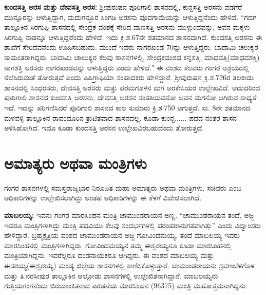 \textbf{ಕುಂದಸತ್ತಿ ಅರಸ ಮತ್ತು ದೇವಸತ್ತಿ ಅರಸ:} ಶ‍್ರೀಪುರುಷನ ಪೂರಿಗಾಲಿ ಶಾಸನದಲ್ಲಿ, ಕುನ್ದಸತ್ತಿ ಅರಸನು ವಡಗೆರೆ ಮುನ್ನೂರನ್ನು ಆಳುತ್ತಿದ್ದಾಗ, ಮದುಗನ್ದೂರ ಸಿಂಗಡಿ ಅರಸನು ಪೂವಗಾಮೆಯನ್ನು ಆಳುತ್ತಿದ್ದನೆಂದು ಹೇಳಿದೆ. “ಗದಗ ತಾಲ್ಲೂಕಿನ ಸಿರಗುಪ್ಪಿ ಶಾಸನದಲ್ಲಿ ಸೇಂದ್ರಕ ವಂಶಕ್ಕೆ ಸೇರಿದ ವಾಣಸತ್ತಿ ಅರಸನು ಮುಳ್ಗುಂದವನ್ನು, ಅವನ ಮಕ್ಕಳು ಸಿರಗುಪ್ಪಿ ನಾಡನ್ನೂ ಆಳುತ್ತಿದ್ದರೆಂದು ಹೇಳಿದೆ. ಇದು ಕ್ರಿ.ಶ.6\enginline{-}7ನೇ ಶತಮಾನದ ಶಾಸನವಾಗಿದೆ. ಕುಂದಸತ್ತಿ ಅರಸನು ಈ ಶಾಖೆಗೆ ಸೇರಿದವನೆಂದು ಊಹಿಸಬಹುದು. ಮುಂದೆ ಇವರು ನಾಗರಖಂಡ 70ನ್ನು ಆಳುತ್ತಿದ್ದರು. ಬಾದಾಮಿ ಚಲುಕ್ಯರ ಸಾಮಂತರಾಗಿದ್ದರು. ಬಾದಾಮಿ ಚಾಲುಕ್ಯರ ಕೆಲವು ಶಾಸನಗಳಲ್ಲಿ, ಸೇಂದ್ರಕವಂಶದ ಕನ್ನಸತ್ತಿ, ಮಾಧವತ್ತಿ(ಮಾಧವಶಕ್ತಿ) ನಾಗಶಕ್ತಿ ಅರಸರು ನಾಗರಖಂಡವನ್ನು ಆಳುತ್ತಿದ್ದರು ಎಂದು ಹೇಳಿದೆ." ಈ ವಂಶದ ಕೆಲವರು ಗಂಗರ ಆಶ್ರಯದಲ್ಲಿ ನೆಲೆಸಿರುವಂತೆ ತೋರುತ್ತದೆ ಎಂದು ಎಪಿಗ್ರಾಫಿಯಾ ಸಂಪಾದಕರು ಹೇಳಿದ್ದಾರೆ. ಶ‍್ರೀಪುರುಷನ ಕ್ರಿ.ಶ.726ರ ತಲಕಾಡು ಶಾಸನದಲ್ಲಿ ಸಿಂಧರಸರು, ದೇವಸತ್ತಿ ಅರಸರು ಮತ್ತು ಪರಮಗೂಳನ ಮಗ ಅರಕೇಸಿಯರ ಉಲ್ಲೇಖವಿದೆ. ಆದುದರಿಂದ ಪೂರಿಗಾಲಿ ಶಾಸನದ ಕುಂದಸತ್ತಿ ಅರಸನು, ದೇವಸತ್ತಿ ಅರಸನ ಸಂತತಿಯವನೋ ಅವನ ಮಗನೋ ಆಗಿರುವ ಸಾಧ್ಯತೆ ಇದೆ. ಇದನ್ನು ಪರಿಗಣಿಸಿದರೆ ಪೂರಿಗಾಲಿ ಶಾಸನದ ಕಾಲ ಸುಮಾರು ಕ್ರಿ.ಶ.750 ಆಗುತ್ತದೆ. ಸು. 8ನೇ ಶತಮಾನದ ಮಳವಳ್ಳಿ ತಾಲ್ಲೂಕಿನ ರಾವಂದೂರಿನ ತ್ರುಟಿತವಾದ ಶಾಸನ\-ದಲ್ಲ. ಕೂಡಾ ಕುಂನ್ದ...... ಪದದ ನಂತರ ಶಾಸನ ಅಳಿಸಿಹೋಗಿದೆ. ಇದೂ ಕೂಡಾ ಕುಂದಸತ್ತಿ ಅರಸನ ಉಲ್ಲೇಖವಿರಬಹುದೆಂದು ತೋರುತ್ತದೆ.

\section*{ಅಮಾತ್ಯರು ಅಥವಾ ಮಂತ್ರಿಗಳು}

ಗಂಗರ ಶಾಸನಗಳಲ್ಲಿ ಸಮಸ್ತರಾಜ್ಯಭಾರ ನಿರೂಪಿತ ಮಹಾ ಅಮಾತ್ಯರು ಅಥವಾ ಮಂತ್ರಿಗಳು, ಸಚಿವರು ಎಂಬ ಅಧಿಕಾರಿಗಳನ್ನು ಉಲ್ಲೇಖಿಸ\-ಲಾಗಿದ್ದು ಅಂತಹ ಅಧಿಕಾರಿಗಳನ್ನು ಈ ಕೆಳಗೆ ವಿವೇಚಿಸಲಾಗಿದೆ.

\vskip 2pt

\textbf{ಮಾಬಲಯ್ಯ:} ಇವನು ಗಂಗರ ಮಾರಸಿಂಹನ ಮಂತ್ರಿ ಚಾಮುಂಡರಾಯನ ಅಣ್ಣ. “ಚಾಮುಂಡರಾಯನ ತಂದೆ, ಅಜ್ಜ ಇವರೂ ಮಂತ್ರಿಗಳಾಗಿದ್ದು ಮಂತ್ರಿ ಪದವಿಯು ಕೆಲವು ಸಂದರ್ಭಗಳಲ್ಲಿ ಪರಂಪರಾನುಗತವಾಗಿತ್ತು” ಎಂದು ವಿದ್ವಾಂಸರು ಹೇಳಿದ್ದಾರೆ. ಬ್ರಹ್ಮಕ್ಷತ್ರಿಯ ವಂಶದ ಚಾಮುಂಡರಾಯನ ಅಜ್ಜ ಗೋವಿಂದಮಯ್ಯ, ತಂದೆ ಮಾಬಲಯ್ಯ ಇವರು ಮಾರಸಿಂಹನಲ್ಲಿ ಮಂತ್ರಿಗಳಾಗಿದ್ದರು. ಗೋವಿಂದಮಯ್ಯನ ತಮ್ಮ ಈಶ್ವರಯ್ಯನೂ ಕೂಡಾ ಮಾರಸಿಂಹನಲ್ಲಿ ಮಂತ್ರಿಯಾಗಿ\-ದ್ದನು. ಇವರೆಲ್ಲರೂ ದಂಡನಾಯಕರೂ ಆಗಿದ್ದರು. ಈ ವಂಶದ ಮಾಬಲಯ್ಯ ಮತ್ತು ಈಸರಯ್ಯ(ಈಶ್ವರಯ್ಯ) ಮಂಡ್ಯ ಜಿಲ್ಲೆಯ ಶಾಸನಗಳಲ್ಲಿ ಕಾಣಿಸಿಕೊಳ್ಳುತ್ತಾರೆ. ಚಾಮುಂಡರಾಯನು ಶ್ರವಣಬೆಳಗೊಳ ಮತ್ತು ತಿ.ನರಸೀಪುರ ತಾಲ್ಲೂಕಿನ ಆಲ್ಗೋಡು ಶಾಸನಗಳಲ್ಲಿ ಉಲ್ಲೇಖಿತನಾಗಿದ್ದಾನೆ. ಮಾಬಲಯ್ಯನು ಗುತ್ತಿಯಗಂಗನೆಂದು ಬಿರುದಾಂಕಿತನಾದ ಎರಡನೆಯ ಮಾರಸಿಂಹನ (963\enginline{-}75) ಮಂತ್ರಿ ಮಹೋತ್ತಮನಾಗಿದ್ದನು.

